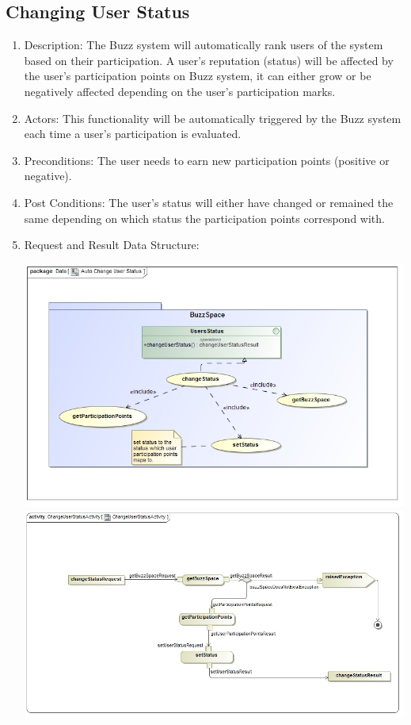\documentclass[12pt, oneside]{book}
\begin{document}
\subsection{Changing User Status}
\begin{enumerate}
\item Description: The Buzz system will automatically rank users of the system based on their participation. A user's  reputation (status) will be affected by the user's participation points on Buzz system, it can either grow or be negatively affected depending on the user's participation marks.   
\item Actors: This functionality will be automatically triggered by the Buzz system each time a user's participation is evaluated.
\item Preconditions: The user needs to earn new participation points (positive or negative).
\item Post Conditions: The user's status will either have changed or remained the same depending on which status the participation points correspond with.
\item Request and Result Data Structure:
\begin{center}
\includegraphics[scale=0.5]{AutoChangeUserStatus.jpg}
\includegraphics[scale=0.5]{ChangeUserStatusActivity.jpg}
\end{center}
\end{enumerate}
\end{document}
